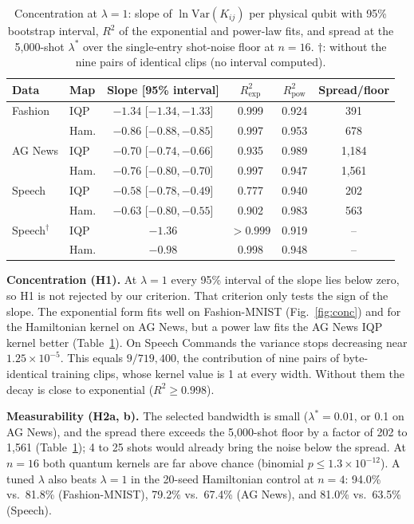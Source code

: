 \documentclass[conference]{IEEEtran}
\begin{document}
\begin{table}[t]
\centering
\caption{Concentration at $\lambda=1$: slope of $\ln\mathrm{Var}(K_{ij})$ per physical qubit with 95\% bootstrap interval, $R^{2}$ of the exponential and power-law fits, and spread at the 5{,}000-shot $\lambda^{*}$ over the single-entry shot-noise floor at $n=16$. $\dagger$: without the nine pairs of identical clips (no interval computed).}
\label{tab:conc}
\setlength{\tabcolsep}{2.5pt}
\begin{tabular}{llcccc}
\toprule
Data & Map & Slope [95\% interval] & $R^{2}_{\exp}$ & $R^{2}_{\mathrm{pow}}$ & Spread/floor \\
\midrule
Fashion & IQP & $-1.34$ [$-1.34,-1.33$] & 0.999 & 0.924 & 391 \\
 & Ham. & $-0.86$ [$-0.88,-0.85$] & 0.997 & 0.953 & 678 \\
AG News & IQP & $-0.70$ [$-0.74,-0.66$] & 0.935 & 0.989 & 1{,}184 \\
 & Ham. & $-0.76$ [$-0.80,-0.70$] & 0.997 & 0.947 & 1{,}561 \\
Speech & IQP & $-0.58$ [$-0.78,-0.49$] & 0.777 & 0.940 & 202 \\
 & Ham. & $-0.63$ [$-0.80,-0.55$] & 0.902 & 0.983 & 563 \\
Speech$^{\dagger}$ & IQP & $-1.36$ & $>0.999$ & 0.919 & -- \\
 & Ham. & $-0.98$ & 0.998 & 0.948 & -- \\
\bottomrule
\end{tabular}
\end{table}

\textbf{Concentration (H1).} At $\lambda=1$ every 95\% interval of the slope lies below zero, so H1 is not rejected by our criterion. That criterion only tests the sign of the slope. The exponential form fits well on Fashion-MNIST (Fig.~\ref{fig:conc}) and for the Hamiltonian kernel on AG News, but a power law fits the AG News IQP kernel better (Table~\ref{tab:conc}). On Speech Commands the variance stops decreasing near $1.25\times10^{-5}$. This equals $9/719{,}400$, the contribution of nine pairs of byte-identical training clips, whose kernel value is 1 at every width. Without them the decay is close to exponential ($R^{2}\geq0.998$).

\textbf{Measurability (H2a, b).} The selected bandwidth is small ($\lambda^{*}=0.01$, or 0.1 on AG News), and the spread there exceeds the 5{,}000-shot floor by a factor of 202 to 1{,}561 (Table~\ref{tab:conc}); 4 to 25 shots would already bring the noise below the spread. At $n=16$ both quantum kernels are far above chance (binomial $p\le1.3\times10^{-12}$). A tuned $\lambda$ also beats $\lambda=1$ in the 20-seed Hamiltonian control at $n=4$: 94.0\% vs.\ 81.8\% (Fashion-MNIST), 79.2\% vs.\ 67.4\% (AG News), and 81.0\% vs.\ 63.5\% (Speech).
\end{document}
